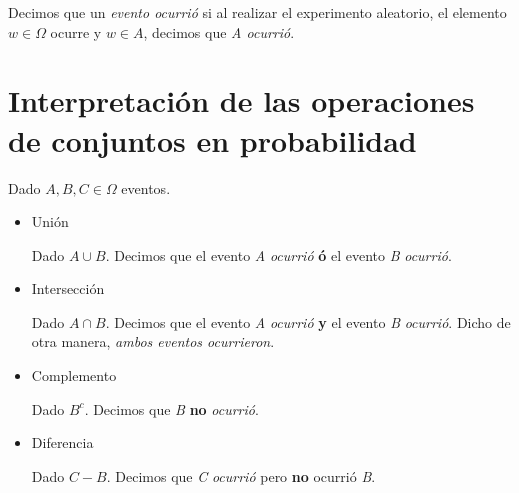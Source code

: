 

Decimos que un \textit{evento ocurrió} si al realizar el experimento aleatorio, el elemento $w \in \Omega$ ocurre y $w \in A$, decimos que \textit{A ocurrió}.


\section{Interpretación de las operaciones de conjuntos en probabilidad}

Dado $A, B, C \in \Omega$ eventos.
\begin{itemize}
  \item Unión

    Dado $A \cup B$. Decimos que el evento \textit{A} \textit{ocurrió} \textbf{ó} el evento \textit{B} \textit{ocurrió}.
  \item Intersección

    Dado $A \cap B$. Decimos que el evento \textit{A} \textit{ocurrió} \textbf{y} el evento \textit{B} \textit{ocurrió}. Dicho de otra manera, \textit{ambos eventos ocurrieron}.
  \item Complemento

    Dado $B^c$. Decimos que \textit{B} \textbf{no} \textit{ocurrió}.
  \item Diferencia

    Dado $C - B$. Decimos que \textit{C} \textit{ocurrió} pero \textbf{no} ocurrió \textit{B}.

\end{itemize}

